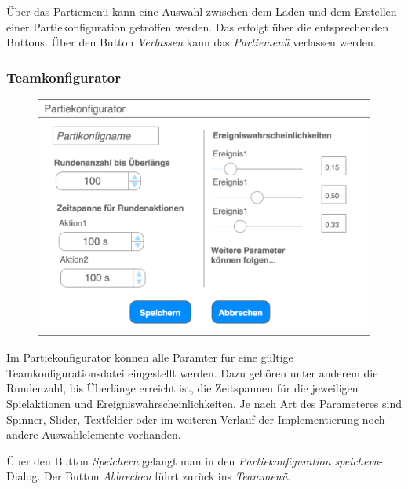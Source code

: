     Über das Partiemenü kann eine Auswahl zwischen dem Laden und dem Erstellen einer Partiekonfiguration getroffen werden. Das erfolgt über die entsprechenden Buttons. Über den Button \textit{Verlassen} kann das \textit{Partiemenü} verlassen werden.

    \subsubsection{Teamkonfigurator}

    \begin{figure}[H]
        \centering
        \includegraphics[width=\textwidth]{images/partiekonfigurator}
    \end{figure}

    Im Partiekonfigurator können alle Paramter für eine gültige Teamkonfigurationsdatei eingestellt werden. Dazu gehören unter anderem die Rundenzahl, bis Überlänge erreicht ist, die Zeitspannen für die jeweiligen Spielaktionen und Ereigniswahrscheinlichkeiten. Je nach Art des Parameteres sind Spinner, Slider, Textfelder oder im weiteren Verlauf der Implementierung noch andere Auswahlelemente vorhanden.

    Über den Button \textit{Speichern} gelangt man in den \textit{Partiekonfiguration speichern}-Dialog. Der Button \textit{Abbrechen} führt zurück ins \textit{Teammenü}.

